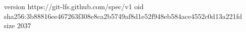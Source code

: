 version https://git-lfs.github.com/spec/v1
oid sha256:3b88816ee467263f308e8ca2b5749af8d1e52f948eb584ace4552c0d13a221fd
size 2037
